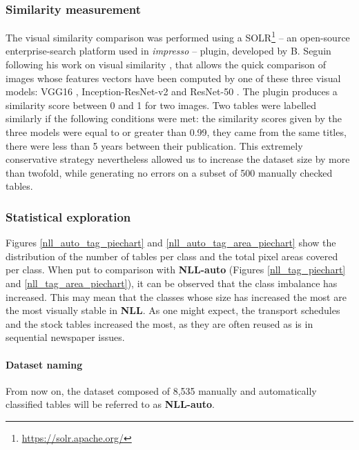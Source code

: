 \subsubsection{Similarity measurement}
The visual similarity comparison was performed using a SOLR\footnote{\url{https://solr.apache.org/}} -- an open-source enterprise-search platform used in \textit{impresso} -- plugin, developed by B. Seguin following his work on visual similarity \citep{seguin_making_2018}, that allows the quick comparison of images whose features vectors have been computed by one of these three visual models: VGG16 \citep{simonyan_very_2015}, Inception-ResNet-v2 \citep{szegedy_inception-v4_2016} and ResNet-50 \citep{he_deep_2015}. The plugin produces a similarity score between 0 and 1 for two images. Two tables were labelled similarly if the following conditions were met: the similarity scores given by the three models were equal to or greater than 0.99, they came from the same titles, there were less than 5 years between their publication. This extremely conservative strategy nevertheless allowed us to increase the dataset size by more than twofold, while generating no errors on a subset of 500 manually checked tables.

\subsubsection{Statistical exploration}
Figures \ref{nll_auto_tag_piechart} and \ref{nll_auto_tag_area_piechart} show the distribution of the number of tables per class and the total pixel areas covered per class. When put to comparison with \textbf{NLL-auto} (Figures \ref{nll_tag_piechart} and \ref{nll_tag_area_piechart}), it can be observed that the class imbalance has increased. This may mean that the classes whose size has increased the most are the most visually stable in \textbf{NLL}. As one might expect, the transport schedules and the stock tables increased the most, as they are often reused as is in sequential newspaper issues.

\paragraph{Dataset naming}
From now on, the dataset composed of 8,535 manually and automatically classified tables will be referred to as \textbf{NLL-auto}.

